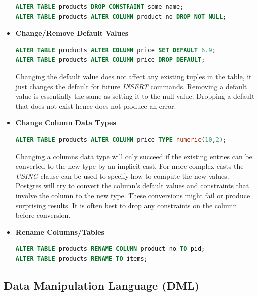 \begin{addmargin}{-.5cm}
\begin{itemize}
\begin{lstlisting}[language=SQL]
ALTER TABLE products DROP CONSTRAINT some_name;
ALTER TABLE products ALTER COLUMN product_no DROP NOT NULL;
\end{lstlisting}
\item \textbf{Change/Remove Default Values}
\begin{lstlisting}[language=SQL]
ALTER TABLE products ALTER COLUMN price SET DEFAULT 6.9;
ALTER TABLE products ALTER COLUMN price DROP DEFAULT;
\end{lstlisting}
Changing the default value does not affect any existing tuples in the table, it just changes the default for future \textit{INSERT} commands. Removing a default value is essentially the same as setting it to the null value. Dropping a default that does not exist hence does not produce an error.
\item \textbf{Change Column Data Types}
\begin{lstlisting}[language=SQL]
ALTER TABLE products ALTER COLUMN price TYPE numeric(10,2);
\end{lstlisting}
Changing a columns data type will only succeed if the existing entries can be converted to the new type by an implicit cast. For more complex casts the \textit{USING} clause can be used to specify how to compute the new values. Postgres will try to convert the column's default values and constraints that involve the column to the new type. These conversions might fail or produce surprising results. It is often best to drop any constraints on the column before conversion.
\item \textbf{Rename Columns/Tables}
\begin{lstlisting}[language=SQL]
ALTER TABLE products RENAME COLUMN product_no TO pid;
ALTER TABLE products RENAME TO items;
\end{lstlisting}
\end{itemize}
\end{addmargin}

\subsection{Data Manipulation Language (DML)}
